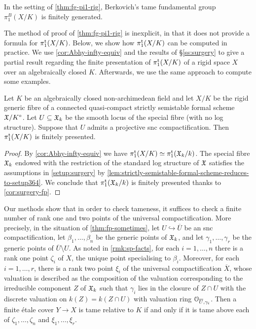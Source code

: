 \begin{cor}
    In the setting of \cref{thm:fg-pi1-rig}, Berkovich's tame fundamental group $\pi_1^B(X/K)$ is finitely generated.
\end{cor}

The method of proof of \cref{thm:fg-pi1-rig} is inexplicit, in that it does not provide a formula for $\pi_1^{\mathrm{t}}(X/K)$. Below, we show how $\pi_1^{\mathrm{t}}(X/K)$ can be computed in practice.  We use \cref{cor:Abhy-infty-equiv} and the results of \S\ref{ss:surgery} to give a partial result regarding the finite presentation of $\pi_1^{\mathrm{t}}(X/K)$ of a rigid space $X$ over an algebraically closed $K$. Afterwards, we use the same approach to compute some examples.

\begin{thm} \label{thm:fp-sometimes}
    Let $K$ be an algebraically closed non-archimedean field and let $X/K$ be the rigid generic fibre of a connected quasi-compact strictly semistable formal scheme ${\mathfrak{X}}/K^\circ$. Let $U\subseteq {\mathfrak{X}}_k$ be the smooth locus of the special fibre (with no log structure). Suppose that $U$ admits a projective snc compactification. Then $\pi_1^{\mathrm{t}}(X/K)$ is finitely presented. 
\end{thm}

\begin{proof}
By \cref{cor:Abhy-infty-equiv} we have $\pi_1^{\mathrm{t}}(X/K)\simeq \pi_1^{\mathrm{t}}({\mathfrak{X}}_k/k)$.
The special fibre ${\mathfrak{X}}_k$ endowed with the restriction of the standard log structure of ${\mathfrak{X}}$ satisfies the assumptions in \cref{setup:surgery} by \cref{lem:strictly-semistable-formal-scheme-reduces-to-setup364}. We conclude that $\pi_1^{\mathrm{t}}({\mathfrak{X}}_k/k)$ is finitely presented thanks to \cref{cor:surgery-fp}.
\end{proof}

\begin{rmk}
    Our methods show that in order to check tameness, it suffices to check a finite number of rank one and two points of the universal compactification. More precisely, in the situation of \cref{thm:fp-sometimes}, let $U\hookrightarrow \overline{U}$ be an snc compactification, let $\beta_1, \dots, \beta_n$ be the generic points of ${\mathfrak{X}}_k$, and let $\gamma_1, \dots, \gamma_r$ be the generic points of $\overline{U}\setminus U$. As noted in \cref{rmk:sp-facts}, for each $i=1,\dots, n$ there is a rank one point $\zeta_i$ of $X$, the unique point specialising to $\beta_i$. Moreover, for each $i=1,\dots, r$, there is a rank two point $\xi_i$ of the universal compactification $\overline{X}$, whose valuation is described as the composition of the valuation corresponding to the irreducible component $Z$ of ${\mathfrak{X}}_k$ such that $\gamma_i$ lies in the closure of $Z \cap U$ with the discrete valuation on $k(Z) = k(Z \cap U)$ with valuation ring ${\mathcal O}_{\overline{U}, \gamma_i}$. Then a finite \'etale cover $Y \to X$ is tame relative to $K$ if and only if it is tame above each of $\zeta_1,\dots,\zeta_n$ and $\xi_1, \dots, \xi_r$. 
\end{rmk}

